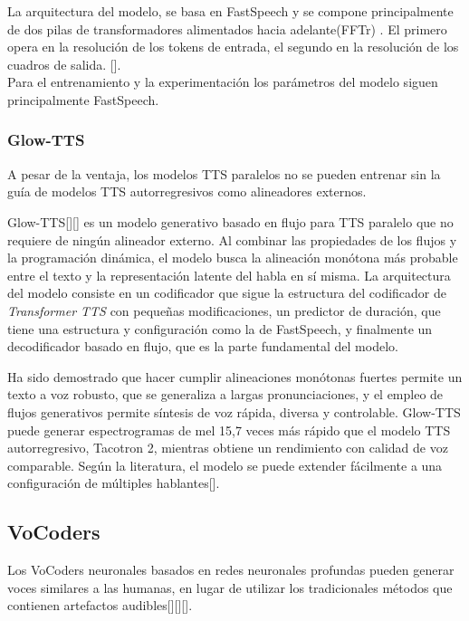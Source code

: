 La arquitectura del modelo, se basa en FastSpeech y se compone principalmente de dos pilas de transformadores alimentados hacia adelante(FFTr) . El primero opera en la resolución de los tokens de entrada, el segundo en la resolución de los cuadros de salida.
[\cite{lancucki2021fastpitch}].\\

Para el entrenamiento y la experimentación los parámetros del modelo siguen principalmente FastSpeech.

\subsubsection{Glow-TTS}
A pesar de la ventaja, los modelos TTS paralelos no se pueden entrenar sin la guía de modelos TTS autorregresivos como alineadores externos. 

Glow-TTS[\cite{kim2020glow}][\cite{glowtts}] es un modelo generativo basado en flujo para TTS paralelo que no requiere de ningún alineador externo. Al combinar las propiedades de los flujos y la programación dinámica, el modelo busca la alineación monótona más probable entre el texto y la representación latente del habla en sí misma.
La arquitectura del modelo consiste en un codificador que sigue la estructura del codificador de \textit{Transformer TTS} con pequeñas modificaciones, un predictor de duración, que tiene una estructura y configuración como la de FastSpeech, y finalmente un decodificador basado en flujo, que es la parte fundamental del modelo.

Ha sido demostrado que hacer cumplir alineaciones monótonas fuertes permite un texto a voz robusto, que se generaliza a largas pronunciaciones, y el empleo de flujos generativos permite síntesis de voz rápida, diversa y controlable. Glow-TTS puede generar espectrogramas de mel 15,7 veces más rápido que el modelo TTS autorregresivo,
Tacotron 2, mientras obtiene un rendimiento con calidad de voz comparable. Según la literatura, el modelo se puede extender fácilmente a una configuración de múltiples hablantes[\cite{kim2020glow}].


\subsection{VoCoders}
  Los VoCoders neuronales basados en redes neuronales profundas pueden generar voces similares a las humanas, en lugar de utilizar los tradicionales
  métodos que contienen artefactos audibles[\cite{griffin1984signal}][\cite{kawahara1999restructuring}][\cite{morise2016world}]. 
  
